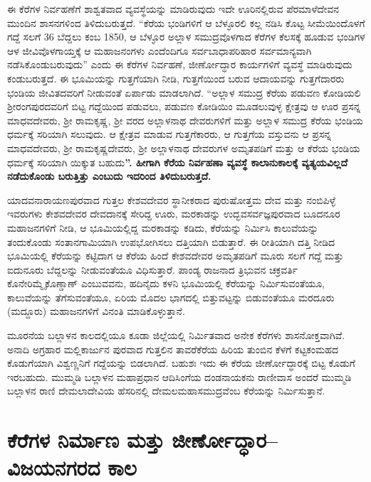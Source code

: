 ಈ ಕೆರೆಗಳ ನಿರ್ವಹಣೆಗೆ ಶಾಶ್ವತವಾದ ವ್ಯವಸ್ಥೆಯನ್ನು ಮಾಡಿರುವುದು ಇದೇ ಊರಿನಲ್ಲಿರುವ ಪೆರಮಾಳೆದೇವನ ಮುಂದಿನ ಶಾಸನಗಳಿಂದ ತಿಳಿದುಬರುತ್ತದೆ. “ಕೆರೆಯ ಭಂಡಿಗಳಿಗೆ ಆ ಬೆಳ್ಳೂರಲಿ ಕಲ್ಲ ನಡಿಸಿ ಕೊಟ್ಟ ಸೀಮೆಯಿಂದೊಳಗೆ ಗದ್ದೆ ಸಲಗೆ 36 ಬೆದ್ದಲು ಕಂಬ 1850, ಆ ಬೆಳ್ಳೂರ ಅಲ್ಲಾಳ ಸಮುದ್ರವೊಳಗಾದ ಕೆರೆಗಳ ಕೆಲಸಕ್ಕೆ ಹೂಡುವ ಭಂಡಿಗಳ ಆಳ ಜೀವಿವೊಳಗಾಯ್ತಕ್ಕೆ ಆ ಮಹಾಜನಂಗಳು ಎಂದೆಂದಿಗೂ ಸರ್ವಬಾಧಾಪರಿಹಾರ ಸರ್ವಮಾನ್ಯವಾಗಿ ನಡೆಸಿಕೊಂಡುಬರುವುದು” ಎಂದು ಈ ಕೆರೆಗಳ ನಿರ್ವಹಣೆ, ಜೀರ್ಣೋದ್ಧಾರ ಕಾರ್ಯಗಳಿಗೆ ವ್ಯವಸ್ಥೆ ಮಾಡಿರುವುದು ಕಂಡುಬರುತ್ತದೆ. ಈ ಭೂಮಿಯನ್ನು ಗುತ್ತಗೆಯಾಗಿ ನೀಡಿ, ಗುತ್ತಗೆಯಿಂದ ಬರುವ ಆದಾಯವನ್ನು ಗುತ್ತಗೆದಾರರು ಭಂಡಿಯ ಜೀವಿತದವರಿಗೆ ನೀಡುವಂತೆ ಏರ್ಪಾಡು ಮಾಡಲಾಗಿದೆ. “ಅಲ್ಲಾಳ ಸಮುದ್ರ ಕೆರೆಯ ಪಡುವಣ ಕೋಡಿಯಲಿ ಶ‍್ರೀರಂಗಪುರದವರಿಗೆ ಬಿಟ್ಟ ಗದ್ದೆಯಿಂದ ಪಡುವಲು, ಪಡುವಣ ಕೋಡಿಯಿಂ ಮೂಡಲುವುಳ್ಳ ಕ್ಷೇತ್ರವು ಆ ಊರ ಪ್ರಸನ್ನ ಮಾಧವದೇವರು, ಶ‍್ರೀ ರಾಮಕೃಷ್ಣ, ಶ‍್ರೀ ವರದ ಅಲ್ಲಾಳನಾಥ ದೇವರುಗಳಿಗೆ ಮತ್ತು ಅಲ್ಲಾಳ ಸಮುದ್ರ ಕೆರೆಯ ಭಂಡಿಯ ಧರ್ಮಕ್ಕೆ ಸರಿಯಾಗಿ ಸಲುವುದು. ಆ ಕ್ಷೇತ್ರವ ಮಾಡುವ ಗುತ್ತಗೆಕಾರರು, ಆ ಗುತ್ತಗೆಯ ವಸ್ತುವನು ಆ ಪ್ರಸನ್ನ ಮಾಧವದೇವರು, ಶ‍್ರೀ ರಾಮಕೃಷ್ಣದೇವರು, ಶ‍್ರೀ ಅಲ್ಲಾಳನಾಥ ದೇವರುಗಳ ಅಮೃತಪಡಿಗೆ ಮತ್ತು ಆ ಕೆರೆಯ ಭಂಡಿಯ ಧರ್ಮಕ್ಕೆ ಸರಿಯಾಗಿ ಯಿಕ್ಕುತ ಬಹುದು\textbf{”. ಹೀಗಾಗಿ ಕೆರೆಯ ನಿರ್ವಹಣಾ ವ್ಯವಸ್ಥೆ ಕಾಲಾನುಕಾಲಕ್ಕೆ ವ್ಯತ್ಯಯವಿಲ್ಲದೆ ನಡೆದುಕೊಂಡು ಬರುತ್ತಿತ್ತು ಎಂಬುದು ಇದರಿಂದ ತಿಳಿದುಬರುತ್ತದೆ. }

ಯಾದವನಾರಾಯಣಪುರವಾದ ಗುತ್ತಲ ಕೇಶವದೇವರ ಸ್ಥಾನೀಕರಾದ ಪುರುಷೋತ್ತಮ ದೇವ ಮತ್ತು ನಂಬಿಪಿಳ್ಳೆ ಇವರುಗಳು ಕೇಶವದೇವರ ದೇವದಾನಕ್ಕೆ ಸೇರಿದ್ದ ಊರು, ಮರಕಾಡನ್ನು ಉದ್ಭವಸರ್ವಜ್ಞಪುರವಾದ ಬೂದನೂರ ಮಹಾಜನಗಳಿಗೆ ನೀಡಿ, ಆ ಭೂಮಿಯಲ್ಲಿದ್ದ ಮರಕಾಡನ್ನು ಕಡಿದು, ಕೆರೆಯನ್ನು ನಿರ್ಮಿಸಿ ಕಾಲುವೆಯನ್ನು ತಂದುಕೊಂಡು ಸಂತಾನಗಾಮಿಯಾಗಿ ಉಪಭೋಗಿಸಲು ದತ್ತಿಯಾಗಿ ಬಿಡುತ್ತಾರೆ. ಈ ರೀತಿಯಾಗಿ ದತ್ತಿ ನೀಡಿದ ಭೂಮಿಯಲ್ಲಿ ಕೆರೆಯನ್ನು ಕಟ್ಟಿದಾಗ ಆ ಕೆರೆಯ ಹಿಂದೆ ಕೇಶವದೇವರ ಅಮೃತಪಡಿಗೆ ಮೂರು ಸಲಗೆ ಗದ್ದೆ ಮತ್ತು ಐದುನೂರು ಬೆದ್ದಲನ್ನು ನೀಡುವಂತೆಯೂ ವಿಧಿಸುತ್ತಾರೆ. ಪಾಂಡ್ಯ ರಾಜನಾದ ತ್ರಿಭುವನ ಚಕ್ರವರ್ತಿ ಕೊನೇರಿಮ್ಮೈಕೊಣ್ಡಾಣ್​ ಎಂಬುವವನು, ಹದಿನೈದು ಕಳನಿ ಭೂಮಿಯಲ್ಲಿ ಕೆರೆಯನ್ನು ನಿರ್ಮಿಸುವಂತೆಯೂ, ಕಾಲುವೆಯನ್ನು ತೆಗೆಸುವಂತೆಯೂ, ಏರಿಯ ಮೊದಲ ಭಾಗದಲ್ಲಿ ಬಿತ್ತುವಟ್ಟನ್ನು ಬಿಡುವಂತೆಯೂ ಮರದೂರು (ಮದ್ದೂರು) ಮಹಾಜನಗಳಿಗೆ ವಿನಂತಿ ಮಾಡಿಕೊಳ್ಳುತ್ತಾನೆ.

ಮೂರನೆಯ ಬಲ್ಲಾಳನ ಕಾಲದಲ್ಲಿಯೂ ಕೂಡಾ ಜಿಲ್ಲೆಯಲ್ಲಿ ನಿರ್ಮಿತವಾದ ಅನೇಕ ಕೆರೆಗಳು ಶಾಸನೋಕ್ತವಾಗಿವೆ. ಅನಾದಿ ಅಗ್ರಹಾರ ಮಲ್ಲಿಕಾರ್ಜುನ ಪುರವಾದ ಗುತ್ತಲಿನ ತಾವರೆಕೆರೆಯ ಹಿರಿಯ ತುಂಬಿನ ಕೆಳಗೆ ಕಟ್ಟಕಂಮಹದ ಕೊಡುಗೆಯಾಗಿ ವಿಶ್ವಣ್ಣನಿಗೆ ಗದ್ದೆಯನ್ನು ಬಿಡಲಾಗಿದೆ. ಬಹುಶಃ ಇದು ಈ ಕೆರೆಯ ಜೀರ್ಣೋದ್ಧಾರಕ್ಕೆ ಬಿಟ್ಟ ಕೊಡುಗೆ ಇರಬಹುದು. ಮುಮ್ಮಡಿ ಬಲ್ಲಾಳನ ಮಹಾಪ್ರಧಾನ ಆದಿಸಿಂಗೆಯ ದಂಡನಾಯಕನು ರಾಣೀವಾಸ ಅಂದರೆ ಮುಮ್ಮಡಿ ಬಲ್ಲಾಳನ ರಾಣಿ ದೇಮಲಾದೇವಿಯ ಹೆಸರಿನಲ್ಲಿ ದೇಮಲಮಹಾಸಮುದ್ರವೆಂಬ ಕೆರೆಯನ್ನು ನಿರ್ಮಿಸುತ್ತಾನೆ.


\section{ಕೆರೆಗಳ ನಿರ್ಮಾಣ ಮತ್ತು ಜೀರ್ಣೋದ್ಧಾರ–ವಿಜಯನಗರದ ಕಾಲ}

